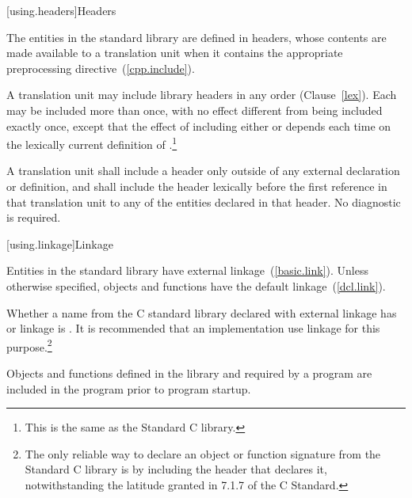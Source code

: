 [using.headers]{Headers}

\pnum
The entities in the \Cpp standard library are defined in headers,
whose contents are made available to a translation unit when it contains the appropriate
%
preprocessing directive~(\ref{cpp.include}).%
%

\pnum
A translation unit may include library headers in any order (Clause~\ref{lex}).
%
Each may be included more than once, with no effect different from
being included exactly once, except that the effect of including either
or
depends each time on the lexically
%
%
%
%
current definition of
%
%
.\footnote{This is the same as the Standard C library.}

\pnum
A translation unit shall include a header only outside of any
%
external declaration or definition, and shall include the header lexically
before the first reference in that translation unit to any of the entities
declared in that header. No diagnostic is required.

[using.linkage]{Linkage}

\pnum
Entities in the \Cpp standard library have external linkage~(\ref{basic.link}).
Unless otherwise specified, objects and functions have the default
linkage~(\ref{dcl.link}).

\pnum
{}%
Whether a name from the C standard library declared with
external linkage has
%
%
%
or
%
linkage is . It is recommended that an
implementation use
linkage for this purpose.\footnote{The only reliable way to declare an object or
function signature from the Standard C library is by including the header that
declares it, notwithstanding the latitude granted in 7.1.7 of the C
Standard.}

\pnum
Objects and functions
defined in the library and required by a \Cpp program are included in
the program prior to program startup.

